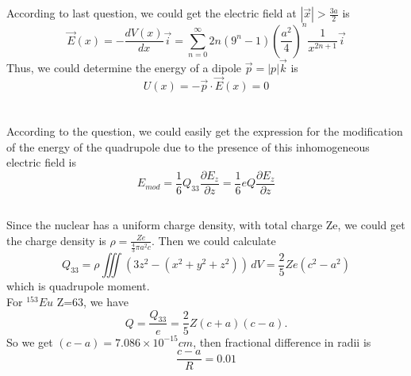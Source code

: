 \documentclass[10.5pt]{article}
\begin{document}
\subsection{}
According to last question, we could get the electric field at $\left\lvert\vec{x} \right\rvert > \frac{3a}{2}$ is $$\vec{E}(x) = -\frac{d V(x)}{d x} \vec{i}= \sum_{n=0}^{\infty} 2n\left(9^n-1\right) \left(\frac{a^2}{4}\right)^n \frac{1}{x^{2n+1}} \vec{i}$$\indent
Thus, we could determine the energy of a dipole $\vec{p}=\left\rvert p\right\rvert \vec{k}$ is $$U(x) = -\vec{p} \cdot \vec{E}(x) = 0$$

\section{}
\subsection{}
According to the question, we could easily get the expression for the modification of the energy of the quadrupole due to the presence of this inhomogeneous electric field is $$E_{mod} = \frac{1}{6} Q_{33} \frac{\partial E_z}{\partial z} = \frac{1}{6}eQ\frac{\partial E_z}{\partial z}$$\indent
\subsection{}
Since the nuclear has a uniform charge density, with total charge Ze, we could get the charge density is $\rho = \frac{Ze}{\frac{4}{3}\pi a^2c}$. Then we could calculate $$Q_{33} = \rho \iiint (3z^2-(x^2+y^2+z^2))\,dV = \frac{2}{5}Ze(c^2-a^2)$$which is quadrupole moment.\\\indent
For $^{153}Eu$ Z=63, we have $$Q = \frac{Q_{33}}{e} = \frac{2}{5} Z(c+a)(c-a).$$\indent
So we get $(c-a)=7.086\times 10^{-15}cm$, then fractional difference in radii is $$\frac{c-a}{R} = 0.01$$
\end{document}

